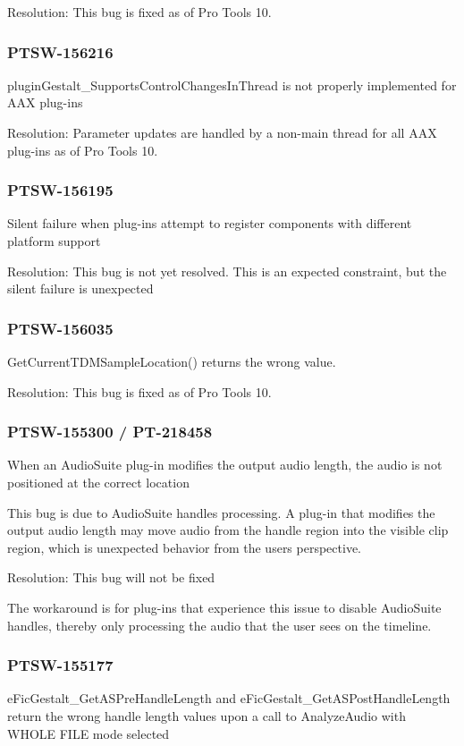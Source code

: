 Resolution\+: This bug is fixed as of Pro Tools 10.\hypertarget{a00846_PTSW-156216}{}\subsubsection{P\+T\+S\+W-\/156216}\label{a00846_PTSW-156216}
{\ttfamily plugin\+Gestalt\+\_\+\+Supports\+Control\+Changes\+In\+Thread} is not properly implemented for A\+AX plug-\/ins

Resolution\+: Parameter updates are handled by a non-\/main thread for all A\+AX plug-\/ins as of Pro Tools 10.\hypertarget{a00846_PTSW-156195}{}\subsubsection{P\+T\+S\+W-\/156195}\label{a00846_PTSW-156195}
Silent failure when plug-\/ins attempt to register components with different platform support

Resolution\+: This bug is not yet resolved. This is an expected constraint, but the silent failure is unexpected\hypertarget{a00846_PTSW-156035}{}\subsubsection{P\+T\+S\+W-\/156035}\label{a00846_PTSW-156035}
{\ttfamily Get\+Current\+T\+D\+M\+Sample\+Location()} returns the wrong value.

Resolution\+: This bug is fixed as of Pro Tools 10.\hypertarget{a00846_PTSW-155300}{}\subsubsection{P\+T\+S\+W-\/155300 / P\+T-\/218458}\label{a00846_PTSW-155300}
When an Audio\+Suite plug-\/in modifies the output audio length, the audio is not positioned at the correct location

This bug is due to Audio\+Suite handles processing. A plug-\/in that modifies the output audio length may move audio from the handle region into the visible clip region, which is unexpected behavior from the user\textquotesingle{}s perspective.

Resolution\+: This bug will not be fixed

The workaround is for plug-\/ins that experience this issue to disable Audio\+Suite handles, thereby only processing the audio that the user sees on the timeline.\hypertarget{a00846_PTSW-155177}{}\subsubsection{P\+T\+S\+W-\/155177}\label{a00846_PTSW-155177}
{\ttfamily e\+Fic\+Gestalt\+\_\+\+Get\+A\+S\+Pre\+Handle\+Length} and {\ttfamily e\+Fic\+Gestalt\+\_\+\+Get\+A\+S\+Post\+Handle\+Length} return the wrong handle length values upon a call to {\ttfamily Analyze\+Audio} with \textquotesingle{}W\+H\+O\+LE F\+I\+LE\textquotesingle{} mode selected

